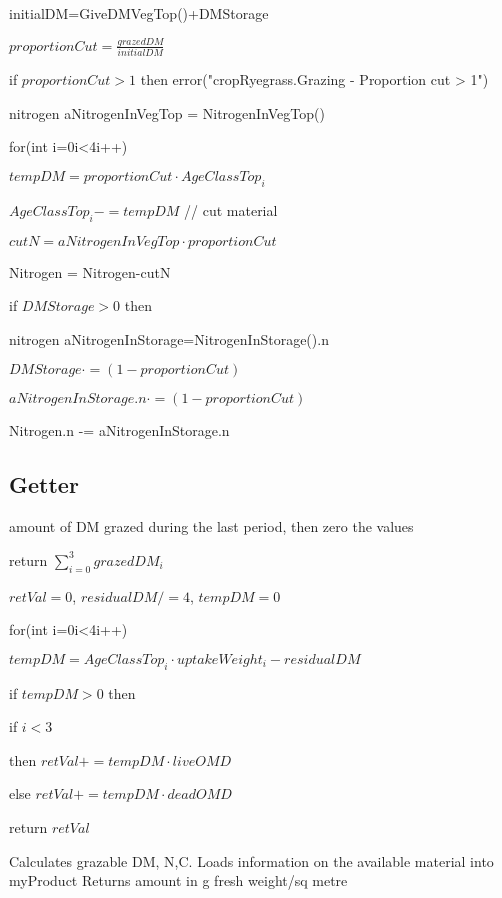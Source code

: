 \documentclass[%
]{scrartcl}
\begin{document}
	   initialDM=GiveDMVegTop()+DMStorage

	  $ proportionCut = \tfrac{grazedDM}{initialDM}$

	   if $proportionCut>1$ then error("cropRyegrass.Grazing - Proportion cut > 1")

	   nitrogen  aNitrogenInVegTop = NitrogenInVegTop()
	 
  for(int i=0i<4i++)
	 
	 \quad     $ tempDM = proportionCut \cdot AgeClassTop_i$

	  \quad     $AgeClassTop_i-= tempDM $  // cut material
	 
      $cutN = aNitrogenInVegTop \cdot proportionCut$

      Nitrogen = Nitrogen-cutN

	   if $DMStorage > 0$ then
	  
	    \quad	  nitrogen aNitrogenInStorage=NitrogenInStorage().n

	  \quad  	 $ DMStorage \cdot =(1-proportionCut)$

	  \quad     $aNitrogenInStorage.n \cdot =(1-proportionCut)$

	  \quad     Nitrogen.n -=  aNitrogenInStorage.n
	  


\subsection{Getter}

amount of DM grazed during the last period, then zero the values

  return  $\sum_{i=0}^3 grazedDM_i$



   $retVal=0$, $residualDM/=4$, $tempDM=0$

   for(int i=0i<4i++)
   
   \quad $tempDM=AgeClassTop_i  \cdot  uptakeWeight_i - residualDM$

    \quad	if $tempDM>0$ then
     
     \quad      \quad if $i<3 $

     \quad      \quad  \quad then $retVal += tempDM  \cdot  liveOMD$

       \quad    \quad  \quad else $retVal += tempDM  \cdot  deadOMD$
   
   
   return $retVal$


Calculates grazable DM, N,C. Loads information on the available material into myProduct
Returns amount in g fresh weight/sq metre
\end{document}
